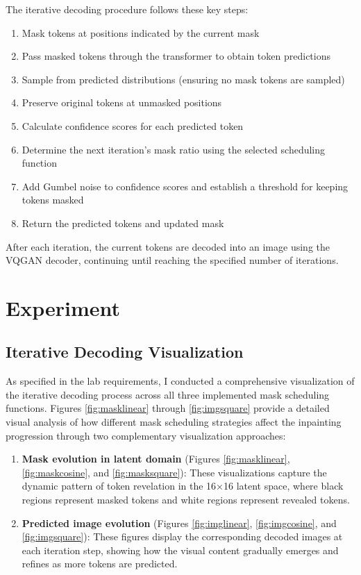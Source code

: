 \documentclass[twocolumn,a4paper]{article}
\begin{document}
The iterative decoding procedure follows these key steps:
\begin{enumerate}
\item Mask tokens at positions indicated by the current mask
\item Pass masked tokens through the transformer to obtain token predictions
\item Sample from predicted distributions (ensuring no mask tokens are sampled)
\item Preserve original tokens at unmasked positions
\item Calculate confidence scores for each predicted token
\item Determine the next iteration's mask ratio using the selected scheduling function
\item Add Gumbel noise to confidence scores and establish a threshold for keeping tokens masked
\item Return the predicted tokens and updated mask
\end{enumerate}


After each iteration, the current tokens are decoded into an image using the VQGAN decoder, continuing until reaching the specified number of iterations.

\section{Experiment}

\subsection{Iterative Decoding Visualization}

As specified in the lab requirements, I conducted a comprehensive visualization of the iterative decoding process across all three implemented mask scheduling functions. Figures \ref{fig:masklinear} through \ref{fig:imgsquare} provide a detailed visual analysis of how different mask scheduling strategies affect the inpainting progression through two complementary visualization approaches:

\begin{enumerate}
\item \textbf{Mask evolution in latent domain} (Figures \ref{fig:masklinear}, \ref{fig:maskcosine}, and \ref{fig:masksquare}): These visualizations capture the dynamic pattern of token revelation in the 16×16 latent space, where black regions represent masked tokens and white regions represent revealed tokens.
\item \textbf{Predicted image evolution} (Figures \ref{fig:imglinear}, \ref{fig:imgcosine}, and \ref{fig:imgsquare}): These figures display the corresponding decoded images at each iteration step, showing how the visual content gradually emerges and refines as more tokens are predicted.
\end{enumerate}
\end{document}
